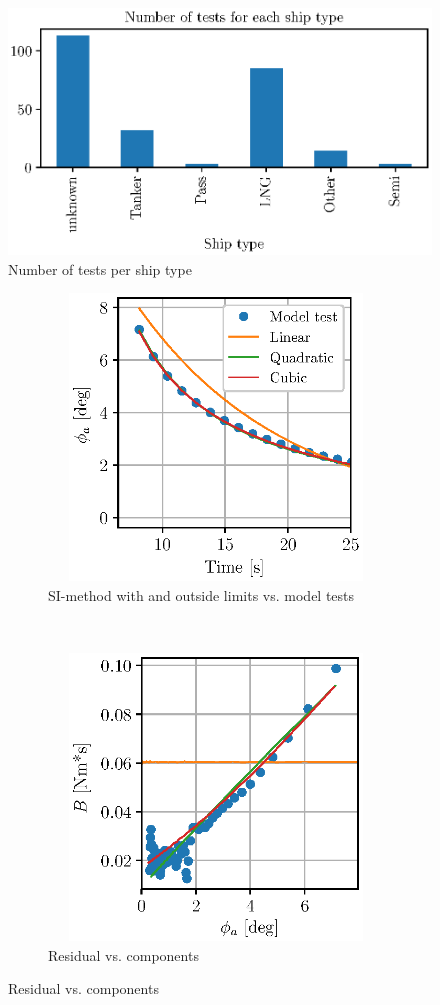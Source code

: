 \begin{figure}[H]
    \centering
    \includegraphics[width=0.5\columnwidth]{figures/ship_types.eps}
    \caption{Number of tests per ship type}
    \label{fig:ship_types}
\end{figure}

\begin{figure}[H]
    \centering
    \begin{subfigure}[b]{0.48\textwidth}
        \centering
  
        \includegraphics[width=3.5in,height=3in]{figures/roll_decay_amplitude.eps}
        \caption{SI-method with and outside limits vs. model tests}
        \label{fig:si_model_within}
    \end{subfigure}
        ~ %
    \begin{subfigure}[b]{0.48\textwidth}
        \centering
        \includegraphics[width=3.5in,height=3in]{figures/roll_decay_damping.eps}
        \caption{Residual vs. components}
        \label{fig:component_residual}
    \end{subfigure}
    
\end{figure}


